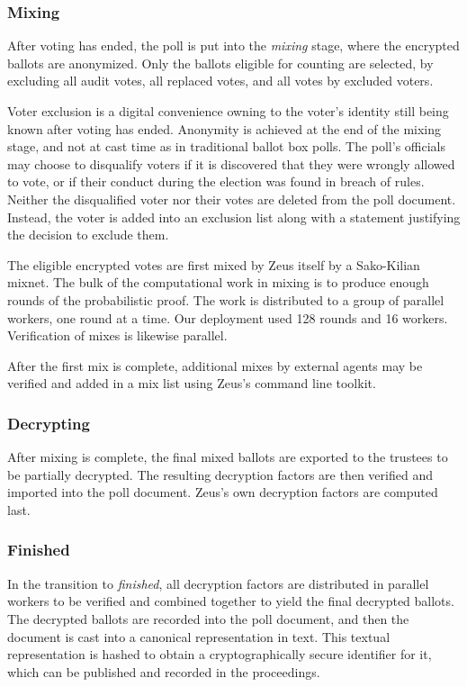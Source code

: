 \documentclass[jets]{usenixjournal}
\begin{document}
\subsubsection{Mixing}
\label{sec:mixing}
After voting has ended, the poll is put into the \emph{mixing} stage,
where the encrypted ballots are anonymized.
Only the ballots eligible for counting are selected, by excluding
all audit votes, all replaced votes, and all votes by excluded voters.

Voter exclusion is a digital convenience owning to
the voter's identity still being known after voting has ended.
Anonymity is achieved at the end of the mixing stage,
and not at cast time as in traditional ballot box polls.
The poll's officials may choose to disqualify voters if
it is discovered that they were wrongly allowed to vote, or if
their conduct during the election was found in breach of rules.
Neither the disqualified voter nor their votes are deleted from 
the poll document. Instead, the voter is added into an exclusion 
list along with a statement justifying the decision to exclude them.

The eligible encrypted votes are first mixed by Zeus itself
by a Sako-Kilian mixnet.
The bulk of the computational work in mixing is to produce
enough rounds of the probabilistic proof.
The work is distributed to a group of parallel workers,
one round at a time. Our deployment used 128 rounds and 16 workers.
Verification of mixes is likewise parallel.

After the first mix is complete, additional mixes by external agents
may be verified and added in a mix list using Zeus's command line
toolkit. 

\subsubsection{Decrypting}
\label{sec:decrypting}

After mixing is complete, the final mixed ballots are exported to
the trustees to be partially decrypted.
The resulting decryption factors are then verified and imported
into the poll document.
Zeus's own decryption factors are computed last.

\subsubsection{Finished}
\label{sec:finished}
In the transition to \emph{finished}, all decryption factors are
distributed in parallel workers to be verified and combined together
to yield the final decrypted ballots.
The decrypted ballots are recorded into the poll document,
and then the document is cast into a canonical representation in text.
This textual representation is hashed to obtain a cryptographically
secure identifier for it, which can be published and recorded
in the proceedings.
\end{document}
